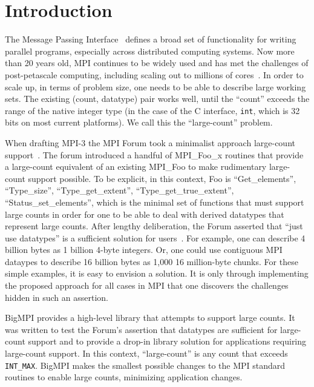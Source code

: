 
\section{Introduction}
\label{sec:intro}

The Message Passing Interface~\cite{mpiforum:94, mpiforum:96, mpiforum:09, mpiforum:12} 
defines a broad set of functionality for writing parallel programs, especially across
distributed computing systems.
Now more than 20 years old, MPI continues to be widely used and has met the challenges of
post-petascale computing, including scaling out to millions of cores~\cite{balaji2011mpi}. 
In order to scale up, in terms of problem size, one needs
to be able to describe large working sets.  The existing (count, datatype) pair
works well, until the ``count'' exceeds the range of the native integer type
(in the case of the C interface, \texttt{int}, which is 32 bits on most current platforms).
We call this the ``large-count'' problem.

When drafting MPI-3 the MPI Forum took a minimalist approach large-count 
support~\cite{ticket265}.
The forum introduced a handful of MPI\_Foo\_x routines that provide a large-count
equivalent of an existing MPI\_Foo to make rudimentary large-count support possible.
To be explicit, in this context, Foo is ``Get\_elements'', ``Type\_size'', ``Type\_get\_extent'', 
``Type\_get\_true\_extent'', ``Status\_set\_elements'', which is the minimal set
of functions that must support large counts in order for one to be able to deal 
with derived datatypes that represent large counts.
After lengthy deliberation, the Forum asserted that ``just use datatypes'' is 
a sufficient solution for users~\cite{squyres-blog-large-count}.
For example, one can describe 4 billion bytes as 1 billion 4-byte integers.
Or, one could use contiguous MPI dataypes to describe 16 billion bytes as 1,000
16 million-byte chunks.  For these simple examples, it is easy to envision a
solution. It is only through implementing the proposed approach for all cases
in MPI that one discovers the challenges hidden in such an assertion.

BigMPI provides a high-level library that attempts to support large counts.
It was written to test the Forum's assertion
that datatypes are sufficient for large-count support and to provide a drop-in library
solution for applications requiring large-count support.
In this context, ``large-count'' is any count that exceeds \texttt{INT\_MAX}.
BigMPI makes the smallest possible changes to the MPI standard routines to
enable large counts, minimizing application changes.

